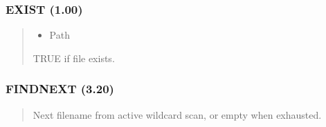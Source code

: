 \documentclass[letterpaper,10pt,english]{sphinxmanual}
\begin{document}
\subsubsection{EXIST (1.00)}
\label{\detokenize{ppl:exist-1-00}}\begin{quote}

\sphinxAtStartPar
{}
\begin{description}
\begin{itemize}
\item {} 
\sphinxAtStartPar
{} \textendash{} Path

\end{itemize}

\sphinxAtStartPar
TRUE if file exists.

\end{description}

\sphinxAtStartPar
{}
\begin{quote}

\begin{sphinxVerbatim}[commandchars=\\\{\}]
    
\end{sphinxVerbatim}
\end{quote}
\end{quote}


\subsubsection{FINDNEXT (3.20)}
\label{\detokenize{ppl:findnext-3-20}}\begin{quote}

\sphinxAtStartPar
{}
\begin{description}
\sphinxAtStartPar
Next filename from active wildcard scan, or empty when exhausted.

\end{description}
\end{quote}
\end{document}
